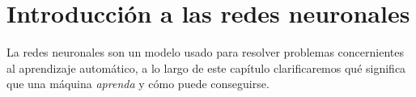 
\chapter{Introducción a las redes neuronales} 

La redes neuronales son un modelo usado para resolver problemas concernientes al aprendizaje automático, 
a lo largo de este capítulo clarificaremos qué significa 
que una máquina \textit{aprenda} y cómo puede conseguirse. 
